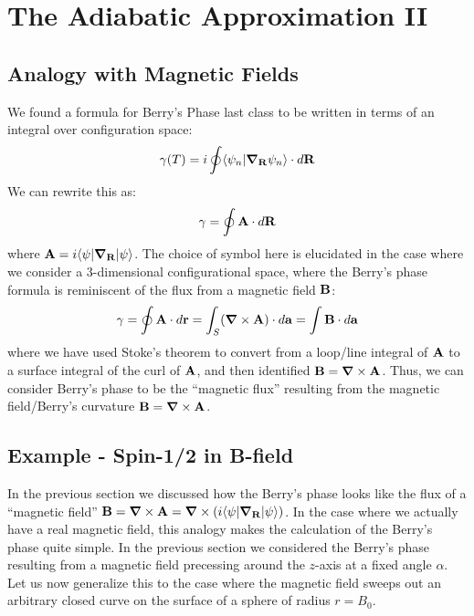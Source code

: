 \section{The Adiabatic Approximation II}
\subsection{Analogy with Magnetic Fields}
We found a formula for Berry's Phase last class to be written in terms of an integral over configuration space:
\begin{equation}
    \gamma(T) = i\oint \braket{\psi_n}{\nabla_\v{R}\psi_n} \cdot d\v{R}
\end{equation}
We can rewrite this as:
\begin{equation}
    \gamma = \oint \mathbf{A} \cdot d\mathbf{R}
\end{equation}
where $\v{A} = i\bra{\psi}\nabla_\v{R}\ket{\psi}$. The choice of symbol here is elucidated in the case where we consider a 3-dimensional configurational space, where the Berry's phase formula is reminiscent of the flux from a magnetic field $\mathbf{B}$:
\begin{equation}
    \gamma = \oint \v{A} \cdot d\v{r} = \int_S (\nabla \times \v{A}) \cdot d\v{a} = \int \v{B} \cdot d\v{a}
\end{equation}
where we have used Stoke's theorem to convert from a loop/line integral of $\mathbf{A}$ to a surface integral of the curl of $\mathbf{A}$, and then identified $\v{B} = \nabla \times \v{A}$. Thus, we can consider Berry's phase to be the ``magnetic flux'' resulting from the magnetic field/Berry's curvature $\v{B} = \nabla \times \v{A}$. 

\subsection{Example - Spin-1/2 in B-field}
In the previous section we discussed how the Berry's phase looks like the flux of a ``magnetic field'' $\v{B} = \nabla \times \v{A} = \nabla \times (i\bra{\psi}\nabla_\v{R}\ket{\psi})$. In the case where we actually have a real magnetic field, this analogy makes the calculation of the Berry's phase quite simple. In the previous section we considered the Berry's phase resulting from a magnetic field precessing around the $z$-axis at a fixed angle $\alpha$. Let us now generalize this to the case where the magnetic field sweeps out an arbitrary closed curve on the surface of a sphere of radius $r = B_0$. 

